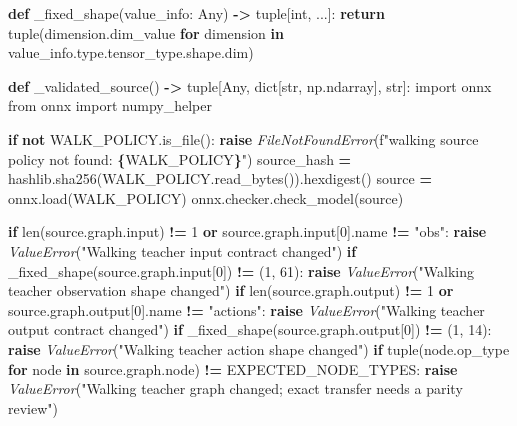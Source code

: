 \documentclass[
  american,
  11pt,
  letterpaper,
]{article}
\newenvironment{Shaded}{\begin{snugshade}}{\end{snugshade}}
\newcommand{\BuiltInTok}[1]{#1}
\newcommand{\ControlFlowTok}[1]{\textcolor[rgb]{0.13,0.29,0.53}{\textbf{#1}}}
\newcommand{\DecValTok}[1]{\textcolor[rgb]{0.00,0.00,0.81}{#1}}
\newcommand{\ImportTok}[1]{#1}
\newcommand{\KeywordTok}[1]{\textcolor[rgb]{0.13,0.29,0.53}{\textbf{#1}}}
\newcommand{\NormalTok}[1]{#1}
\newcommand{\OperatorTok}[1]{\textcolor[rgb]{0.81,0.36,0.00}{\textbf{#1}}}
\newcommand{\PreprocessorTok}[1]{\textcolor[rgb]{0.56,0.35,0.01}{\textit{#1}}}
\newcommand{\SpecialCharTok}[1]{\textcolor[rgb]{0.81,0.36,0.00}{\textbf{#1}}}
\newcommand{\SpecialStringTok}[1]{\textcolor[rgb]{0.31,0.60,0.02}{#1}}
\newcommand{\StringTok}[1]{\textcolor[rgb]{0.31,0.60,0.02}{#1}}
\renewenvironment{Shaded}{\par\smallskip}{\par\smallskip}
\begin{document}
\begin{Shaded}
\begin{Highlighting}[]
\KeywordTok{def}\NormalTok{ \_fixed\_shape(value\_info: Any) }\OperatorTok{{-}\textgreater{}} \BuiltInTok{tuple}\NormalTok{[}\BuiltInTok{int}\NormalTok{, ...]:}
    \ControlFlowTok{return} \BuiltInTok{tuple}\NormalTok{(dimension.dim\_value }\ControlFlowTok{for}\NormalTok{ dimension }\KeywordTok{in}\NormalTok{ value\_info.}\BuiltInTok{type}\NormalTok{.tensor\_type.shape.dim)}


\KeywordTok{def}\NormalTok{ \_validated\_source() }\OperatorTok{{-}\textgreater{}} \BuiltInTok{tuple}\NormalTok{[Any, }\BuiltInTok{dict}\NormalTok{[}\BuiltInTok{str}\NormalTok{, np.ndarray], }\BuiltInTok{str}\NormalTok{]:}
    \ImportTok{import}\NormalTok{ onnx}
    \ImportTok{from}\NormalTok{ onnx }\ImportTok{import}\NormalTok{ numpy\_helper}

    \ControlFlowTok{if} \KeywordTok{not}\NormalTok{ WALK\_POLICY.is\_file():}
        \ControlFlowTok{raise} \PreprocessorTok{FileNotFoundError}\NormalTok{(}\SpecialStringTok{f"walking source policy not found: }\SpecialCharTok{\{}\NormalTok{WALK\_POLICY}\SpecialCharTok{\}}\SpecialStringTok{"}\NormalTok{)}
\NormalTok{    source\_hash }\OperatorTok{=}\NormalTok{ hashlib.sha256(WALK\_POLICY.read\_bytes()).hexdigest()}
\NormalTok{    source }\OperatorTok{=}\NormalTok{ onnx.load(WALK\_POLICY)}
\NormalTok{    onnx.checker.check\_model(source)}

    \ControlFlowTok{if} \BuiltInTok{len}\NormalTok{(source.graph.}\BuiltInTok{input}\NormalTok{) }\OperatorTok{!=} \DecValTok{1} \KeywordTok{or}\NormalTok{ source.graph.}\BuiltInTok{input}\NormalTok{[}\DecValTok{0}\NormalTok{].name }\OperatorTok{!=} \StringTok{"obs"}\NormalTok{:}
        \ControlFlowTok{raise} \PreprocessorTok{ValueError}\NormalTok{(}\StringTok{"Walking teacher input contract changed"}\NormalTok{)}
    \ControlFlowTok{if}\NormalTok{ \_fixed\_shape(source.graph.}\BuiltInTok{input}\NormalTok{[}\DecValTok{0}\NormalTok{]) }\OperatorTok{!=}\NormalTok{ (}\DecValTok{1}\NormalTok{, }\DecValTok{61}\NormalTok{):}
        \ControlFlowTok{raise} \PreprocessorTok{ValueError}\NormalTok{(}\StringTok{"Walking teacher observation shape changed"}\NormalTok{)}
    \ControlFlowTok{if} \BuiltInTok{len}\NormalTok{(source.graph.output) }\OperatorTok{!=} \DecValTok{1} \KeywordTok{or}\NormalTok{ source.graph.output[}\DecValTok{0}\NormalTok{].name }\OperatorTok{!=} \StringTok{"actions"}\NormalTok{:}
        \ControlFlowTok{raise} \PreprocessorTok{ValueError}\NormalTok{(}\StringTok{"Walking teacher output contract changed"}\NormalTok{)}
    \ControlFlowTok{if}\NormalTok{ \_fixed\_shape(source.graph.output[}\DecValTok{0}\NormalTok{]) }\OperatorTok{!=}\NormalTok{ (}\DecValTok{1}\NormalTok{, }\DecValTok{14}\NormalTok{):}
        \ControlFlowTok{raise} \PreprocessorTok{ValueError}\NormalTok{(}\StringTok{"Walking teacher action shape changed"}\NormalTok{)}
    \ControlFlowTok{if} \BuiltInTok{tuple}\NormalTok{(node.op\_type }\ControlFlowTok{for}\NormalTok{ node }\KeywordTok{in}\NormalTok{ source.graph.node) }\OperatorTok{!=}\NormalTok{ EXPECTED\_NODE\_TYPES:}
        \ControlFlowTok{raise} \PreprocessorTok{ValueError}\NormalTok{(}\StringTok{"Walking teacher graph changed; exact transfer needs a parity review"}\NormalTok{)}


\end{Highlighting}
\end{Shaded}
\end{document}
